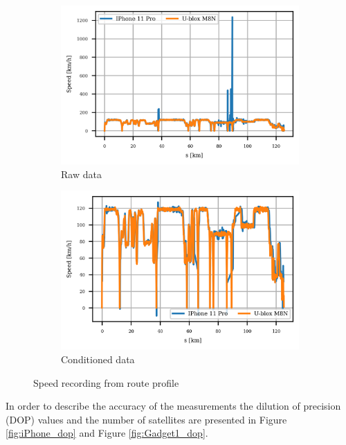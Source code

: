 \documentclass{article}
\begin{document}
			\begin{figure}[h]
		   		\centering
		     	\begin{subfigure}[b]{0.45\textwidth}
		      		\centering
		      	  	\includegraphics[width=\textwidth]{Route/raw_speed.png}
		      	  	\caption{Raw data}
		     	\end{subfigure}
		     	\begin{subfigure}[b]{0.45\textwidth}
		      	   \centering
		      	   \includegraphics[width=\textwidth]{Route/cond_speed.png}
		      	   \caption{Conditioned data}
		     	\end{subfigure}
			   \caption{Speed recording from route profile}
			   \label{fig:route_speed}
		   \end{figure}

			In order to describe the accuracy of the measurements the dilution of precision (DOP) values and the number of satellites are presented in Figure \ref{fig:iPhone_dop} and Figure \ref{fig:Gadget1_dop}. 
			
\end{document}
